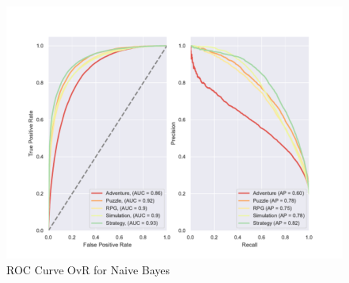 \begin{figure}
    \centering
    \includegraphics[width=\textwidth]{data/results/plots/naive_bayes_roc}
    \caption{ROC Curve OvR for Naive Bayes}
    \label{fig:naive_bayes_roc}
\end{figure}
